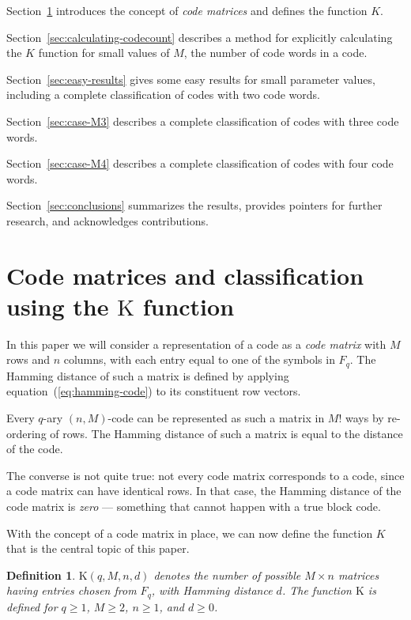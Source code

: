 \documentclass[a4paper]{article}
\newcommand{\codecount}{\mathrm{K}}
\newtheorem{definition}{Definition}
\begin{document}
Section~\ref{sec:code-matrices} introduces the concept of \emph{code matrices} and defines the function $K$.

Section~\ref{sec:calculating-codecount} describes a method for explicitly calculating the $K$ function for small values of $M$, the number of code words in a code.

Section~\ref{sec:easy-results} gives some easy results for small parameter values, including a complete classification of codes with two code words.

Section~\ref{sec:case-M3} describes a complete classification of codes with three code words.

Section~\ref{sec:case-M4} describes a complete classification of codes with four code words.

Section~\ref{sec:conclusions} summarizes the results, provides pointers for further research, and acknowledges contributions.

\section{Code matrices and classification using the $\codecount$ function}
\label{sec:code-matrices}

In this paper we will consider a representation of a code as a \emph{code matrix} with $M$ rows and $n$ columns, with each entry equal to one of the symbols in $F_q$.
The Hamming distance of such a matrix is defined by applying equation~(\ref{eq:hamming-code}) to its constituent row vectors.

Every $q$-ary $(n,M)$-code can be represented as such a matrix in $M!$ ways by re-ordering of rows. The Hamming distance of such a matrix is equal
to the distance of the code.

The converse is not quite true: not every code matrix corresponds to a code, since a code matrix can have identical rows.
In that case, the Hamming distance of the code matrix is \emph{zero} --- something that cannot happen with a true block code.

With the concept of a code matrix in place, we can now define the function $K$ that is the central topic of this paper.

\begin{definition}
$\codecount(q,M,n,d)$ denotes the number of possible $M \times n$ matrices having entries chosen from $F_q$, with Hamming distance $d$.
The function $\codecount$ is defined for $q \ge 1$, $M \ge 2$, $n \ge 1$, and $d \ge 0$.
\end{definition}
\end{document}
